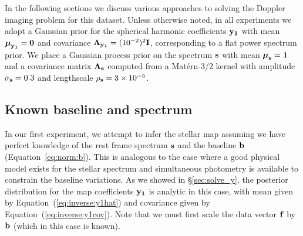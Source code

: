 \documentclass[modern]{aastex631}
\begin{document}
%

In the following sections we discuss various approaches to solving the Doppler imaging problem for this dataset.
Unless otherwise noted, in all experiments we adopt a Gaussian prior for the spherical harmonic coefficients ${\mathbf{y_1}}$ with mean $\boldsymbol{\mu}_{\mathbf{y_1}} = {\mathbf{0}}$ and covariance $\boldsymbol{\Lambda}_{\mathbf{y_1}} = (10^{-2})^2{\mathbf{I}}$, corresponding to a flat power spectrum prior.
We place a Gaussian process prior on the spectrum ${\mathbf{s}}$ with mean $\boldsymbol{\mu}_{\mathbf{s}} = {\mathbf{1}}$ and a covariance matrix $\boldsymbol{\Lambda}_{\mathbf{s}}$ computed from a Mat\'ern-3/2 kernel with amplitude $\sigma_{\mathbf{s}} = 0.3$ and lengthscale $\rho_{\mathbf{s}} = 3\times 10^{-5}$.

\subsection{Known baseline and spectrum}
\label{sec:spot_y1}
%
In our first experiment, we attempt to infer the stellar map assuming we have perfect knowledge of the rest frame spectrum ${\mathbf{s}}$ and the baseline ${\mathbf{b}}$ (Equation~\ref{eq:norm:b}).
This is analogous to the case where a good physical model exists for the stellar spectrum and simultaneous photometry is available to constrain the baseline variations.
As we showed in \S\ref{sec:solve_y}, the posterior distribution for the map coefficients ${\mathbf{y_1}}$ is analytic in this case, with mean given by Equation~(\ref{eq:inverse:y1hat})
and covariance given by Equation~(\ref{eq:inverse:y1cov}). 
Note that we must first scale the data vector ${\mathbf{f}}$ by ${\mathbf{b}}$ (which in this case is known).
\end{document}
